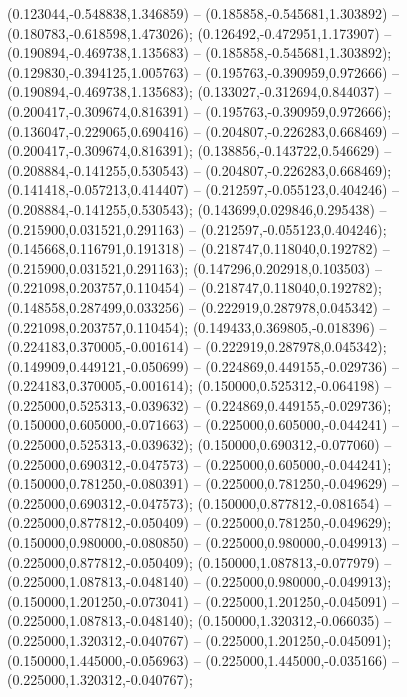  (0.123044,-0.548838,1.346859) -- (0.185858,-0.545681,1.303892) -- (0.180783,-0.618598,1.473026);
 (0.126492,-0.472951,1.173907) -- (0.190894,-0.469738,1.135683) -- (0.185858,-0.545681,1.303892);
 (0.129830,-0.394125,1.005763) -- (0.195763,-0.390959,0.972666) -- (0.190894,-0.469738,1.135683);
 (0.133027,-0.312694,0.844037) -- (0.200417,-0.309674,0.816391) -- (0.195763,-0.390959,0.972666);
 (0.136047,-0.229065,0.690416) -- (0.204807,-0.226283,0.668469) -- (0.200417,-0.309674,0.816391);
 (0.138856,-0.143722,0.546629) -- (0.208884,-0.141255,0.530543) -- (0.204807,-0.226283,0.668469);
 (0.141418,-0.057213,0.414407) -- (0.212597,-0.055123,0.404246) -- (0.208884,-0.141255,0.530543);
 (0.143699,0.029846,0.295438) -- (0.215900,0.031521,0.291163) -- (0.212597,-0.055123,0.404246);
 (0.145668,0.116791,0.191318) -- (0.218747,0.118040,0.192782) -- (0.215900,0.031521,0.291163);
 (0.147296,0.202918,0.103503) -- (0.221098,0.203757,0.110454) -- (0.218747,0.118040,0.192782);
 (0.148558,0.287499,0.033256) -- (0.222919,0.287978,0.045342) -- (0.221098,0.203757,0.110454);
 (0.149433,0.369805,-0.018396) -- (0.224183,0.370005,-0.001614) -- (0.222919,0.287978,0.045342);
 (0.149909,0.449121,-0.050699) -- (0.224869,0.449155,-0.029736) -- (0.224183,0.370005,-0.001614);
 (0.150000,0.525312,-0.064198) -- (0.225000,0.525313,-0.039632) -- (0.224869,0.449155,-0.029736);
 (0.150000,0.605000,-0.071663) -- (0.225000,0.605000,-0.044241) -- (0.225000,0.525313,-0.039632);
 (0.150000,0.690312,-0.077060) -- (0.225000,0.690312,-0.047573) -- (0.225000,0.605000,-0.044241);
 (0.150000,0.781250,-0.080391) -- (0.225000,0.781250,-0.049629) -- (0.225000,0.690312,-0.047573);
 (0.150000,0.877812,-0.081654) -- (0.225000,0.877812,-0.050409) -- (0.225000,0.781250,-0.049629);
 (0.150000,0.980000,-0.080850) -- (0.225000,0.980000,-0.049913) -- (0.225000,0.877812,-0.050409);
 (0.150000,1.087813,-0.077979) -- (0.225000,1.087813,-0.048140) -- (0.225000,0.980000,-0.049913);
 (0.150000,1.201250,-0.073041) -- (0.225000,1.201250,-0.045091) -- (0.225000,1.087813,-0.048140);
 (0.150000,1.320312,-0.066035) -- (0.225000,1.320312,-0.040767) -- (0.225000,1.201250,-0.045091);
 (0.150000,1.445000,-0.056963) -- (0.225000,1.445000,-0.035166) -- (0.225000,1.320312,-0.040767);
